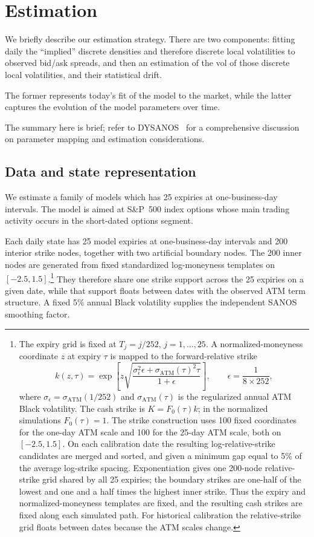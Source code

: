 \documentclass[11pt]{article}
\theoremstyle{plain}
\theoremstyle{definition}
\theoremstyle{remark}
\begin{document}
\section{Estimation}\label{sec:estimation}

We briefly describe our estimation strategy. There are two components: fitting daily the ``implied'' discrete densities and therefore discrete local volatilities
to observed bid/ask spreads, and then an estimation of the vol of those discrete local volatilities, and their statistical drift.

The former represents today's fit of the model to the market, while the latter captures the evolution of the model parameters over time.

The summary here is brief; refer
to DYSANOS~\cite{DYSANOS2026} for a comprehensive discussion on parameter mapping and estimation considerations.

\subsection{Data and state representation}
\label{sec:estimation-data}

We estimate a family of models which has 25 expiries at one-business-day intervals. The model is aimed at S\&P~500 index options
whose main trading activity occurs in the short-dated options segment.

Each daily state has 25 model expiries at one-business-day intervals and 200
interior strike nodes, together with two artificial boundary nodes. The 200
inner nodes are generated from fixed standardized log-moneyness templates on
$[-2.5,1.5]$.\footnote{The expiry grid is fixed at $T_j=j/252$,
$j=1,\ldots,25$.  A normalized-moneyness coordinate $z$ at expiry $\tau$ is
mapped to the forward-relative strike
\[
  k(z,\tau)=\exp\!\left[z\sqrt{
    \frac{\sigma_{\epsilon}^2\epsilon+
    \sigma_{\mathrm{ATM}}(\tau)^2\tau}{1+\epsilon}}
  \right],
  \qquad \epsilon=\frac{1}{8\times252},
\]
where $\sigma_{\epsilon}=\sigma_{\mathrm{ATM}}(1/252)$ and
$\sigma_{\mathrm{ATM}}(\tau)$ is the regularized annual ATM Black volatility.
The cash strike is $K=F_0(\tau)k$; in the normalized simulations $F_0(\tau)=1$.
The strike construction uses 100 fixed coordinates for the one-day ATM scale
and 100 for the 25-day ATM scale, both on $[-2.5,1.5]$.  On each calibration
date the resulting log-relative-strike candidates are merged and sorted, and
given a minimum gap equal to 5\% of the average log-strike spacing.
Exponentiation gives one 200-node relative-strike grid shared by all 25
expiries; the boundary strikes are one-half of the lowest and one and a half
times the highest inner strike.  Thus the expiry and normalized-moneyness
templates are fixed, and the resulting cash strikes are fixed along each
simulated path.  For historical calibration the relative-strike grid floats
between dates because the ATM scales change.}
They therefore share one strike support across the 25 expiries on a given
date, while that support floats between dates with the observed ATM term
structure. A fixed 5\% annual Black volatility supplies the independent SANOS
smoothing factor.
\end{document}
